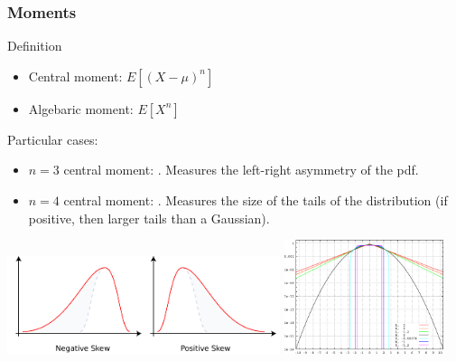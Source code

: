 \documentclass[9pt]{beamer}
\newif\ifmynote
\newcommand\mynote[1]{%
\ifmynote \textbf{#1} \else \fi
}
\begin{document}
\begin{frame}
 \frametitle{Moments}
 
 \mynote{Écrire au tableau}
 
 \begin{block}{Definition}
  \begin{itemize}
   \item Central moment: $E\left[ (X-\mu)^n \right]$
   \item Algebaric moment: $E\left[ X^n \right]$
  \end{itemize}

 \end{block}

 Particular cases: 
 
 \begin{itemize}
  \item $n=3$ central moment: . Measures the left-right asymmetry of the pdf.
  \item $n=4$ central moment: . Measures the size of the tails of the distribution (if positive, then larger tails than a Gaussian).
 \end{itemize}

 \begin{center}
  \includegraphics[width=0.6\textwidth]{Negative_and_positive_skew_diagrams}
  \includegraphics[width=0.35\textwidth]{Standard_symmetric_pdfs_logscale.png}
 \end{center}

 
\end{frame}
\end{document}
